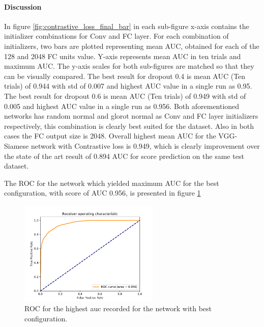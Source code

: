 \paragraph{Discussion\\}
In figure \ref{fig:contrastive_loss_final_bar} in each sub-figure x-axis contains the initializer combinations for Conv and FC layer. For each combination of initializers, two bars are plotted representing mean AUC,
obtained for each of the 128 and 2048 FC units value. Y-axis represents mean AUC in ten trials and maximum AUC. The y-axis scales for both sub-figures are matched so that they can be visually compared.
The best result for dropout 0.4 is mean AUC (Ten trials) of 0.944 with std of 0.007 and highest AUC value in a single run as 0.95. The best
result for dropout 0.6 is mean AUC (Ten trials) of 0.949 with std of 0.005 and highest AUC value in a single run as 0.956. Both aforementioned networks has random normal and glorot normal as Conv and FC layer initializers respectively,
this combination is clearly best suited for the dataset. Also in both cases the FC output size is 2048. Overall highest mean AUC for the VGG-Siamese network with Contrastive loss is 0.949, which is clearly improvement over the
state of the art result of 0.894 AUC for score prediction on the same test dataset.

The ROC for the network which yielded maximum AUC for the best configuration, with score of AUC 0.956, is presented in figure \ref{fig:keras_contrastive_loss_20Dec2pm0}
\begin{figure}[ht]
\centering
\includegraphics[height= 5cm]{images/contrastive/keras_contrastive_loss_20Dec2pm0_956}
\caption{ROC for the highest auc recorded for the network with best configuration.}
\label{fig:keras_contrastive_loss_20Dec2pm0}
\end{figure}

